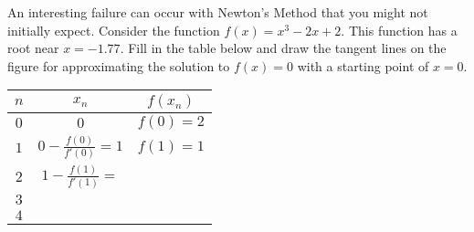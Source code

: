 \begin{problem}
    An interesting failure can occur with Newton's Method that you might not initially
    expect.  Consider the function $f(x) = x^3 - 2x + 2$.  This function has a root near
    $x=-1.77$.  Fill in the table below and draw the tangent lines on the figure for
    approximating the solution to $f(x) = 0$ with a starting point of $x=0$. 

    \begin{minipage}{0.5\columnwidth}
        \begin{center}
            \begin{tabular}{|c|c|c|}
                \hline
                $n$ & $x_n$ & $f(x_n)$ \\ \hline \hline
                $0$ & $0$   & $f(0) = 2$ \\ \hline
                $1$ & $0 - \frac{f(0)}{f'(0)} = 1$ & $f(1) = 1$ \\ \hline
                $2$ & $1 - \frac{f(1)}{f'(1)} =  $ & \\\hline
                $3$ & & \\\hline
                $4$ & & \\\hline
            \end{tabular}
        \end{center}
    \end{minipage}
    \begin{minipage}{0.5\columnwidth}
        \begin{center}
        \end{center}
    \end{minipage}
\end{problem}


